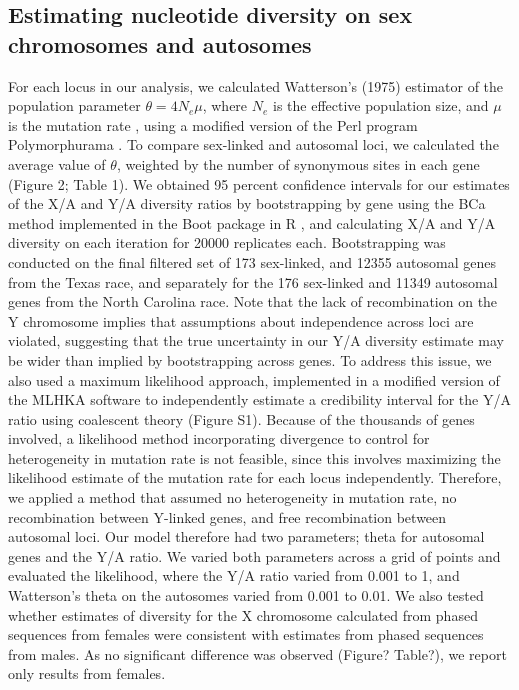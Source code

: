 \documentclass[9pt,twocolumn,twoside]{gsajnl}
\begin{document}
\subsection*{Estimating nucleotide diversity on sex chromosomes and autosomes}
For each locus in our analysis, we calculated Watterson’s (1975) estimator of the population parameter $\theta=4N_{e}\mu$, where $N_{e}$ is the effective population size, and $\mu$ is the mutation rate \citep{watterson1975}, using a modified version of the Perl program Polymorphurama \citep{bachtrog2006}. To compare sex-linked and autosomal loci, we calculated the average value of $\theta$, weighted by the number of synonymous sites in each gene (\X Figure 2; Table 1). We obtained 95 percent confidence intervals for our estimates of the X/A and Y/A diversity ratios by bootstrapping by gene using the BCa method \citep{efron1994} implemented in the Boot package in R \citep{canty2012boot}, and calculating X/A and Y/A diversity on each iteration for 20000 replicates each. Bootstrapping was conducted on the final filtered set of 173 sex-linked, and 12355 autosomal genes from the Texas race, and separately for the 176 sex-linked and 11349 autosomal genes from the North Carolina race. Note that the lack of recombination on the Y chromosome implies that assumptions about independence across loci are violated, suggesting that the true uncertainty in our Y/A diversity estimate may be wider than implied by bootstrapping across genes. To address this issue, we also used a maximum likelihood approach, implemented in a modified version of the MLHKA software \citep{wright2004hka} to independently estimate a credibility interval for the Y/A ratio using coalescent theory (Figure S1). Because of the thousands of genes involved, a likelihood method incorporating divergence to control for heterogeneity in mutation rate is not feasible, since this involves maximizing the likelihood estimate of the mutation rate for each locus independently.  Therefore, we applied a method that assumed no heterogeneity in mutation rate, no recombination between Y-linked genes, and free recombination between autosomal loci. Our model therefore had two parameters; theta for autosomal genes and the Y/A ratio. We varied both parameters across a grid of points and evaluated the likelihood, where the Y/A ratio varied from 0.001 to 1, and Watterson's theta on the autosomes varied from 0.001 to 0.01. We also tested whether estimates of diversity for the X chromosome calculated from phased sequences from females were consistent with estimates from phased sequences from males. As no significant difference was observed (\X Figure? Table?), we report only results from females.
\end{document}
